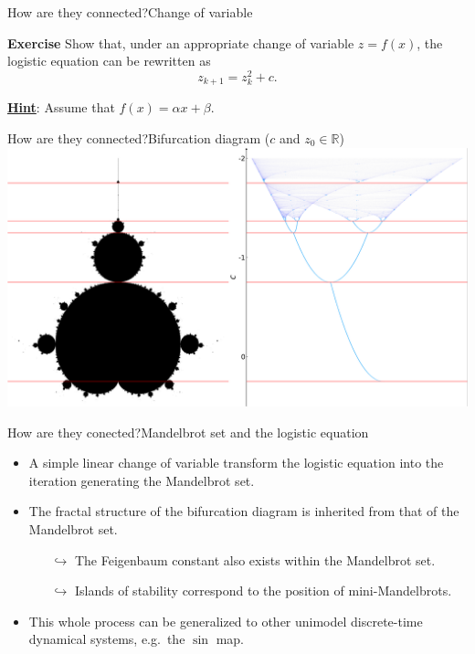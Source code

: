 \documentclass[usenames,dvipsnames,svgnames,10pt,aspectratio=169]{beamer}
\begin{document}
\begin{frame}[t, c]{How are they connected?}{Change of variable}
	\centering
	\begin{block}{\centering \textbf{Exercise}}
		Show that, under an appropriate change of variable $z = f(x)$, the logistic equation can be rewritten as
		$$
		z_{k+1} = z_k^2 + c.
		$$
	\end{block}
	\bigskip
	\underline{\textbf{Hint}}: Assume that $f(x) = \alpha x + \beta$.
	\vspace{1cm}
\end{frame}

\begin{frame}[t, c]{How are they connected?}{Bifurcation diagram ($c$ and $z_0 \in \mathbb{R}$)}
	\centering
	\includegraphics[width=.8\textwidth]{mandelbrot_logistic_bifurcation}
	\vspace{1cm}
\end{frame}

\begin{frame}[t, c]{How are they conected?}{Mandelbrot set and the logistic equation}
	\begin{itemize}
		\item A simple linear change of variable transform the logistic equation into the iteration generating the Mandelbrot set.
		\medskip
		\item The fractal structure of the bifurcation diagram is inherited from that of the Mandelbrot set.
		\begin{itemize}
			\item[$\hookrightarrow$] The Feigenbaum constant also exists within the Mandelbrot set.
			\item[$\hookrightarrow$] Islands of stability correspond to the position of mini-Mandelbrots.
		\end{itemize}
		\medskip
		\item This whole process can be generalized to other unimodel discrete-time dynamical systems, e.g.\ the $\sin$ map.
	\end{itemize}

	\vspace{1cm}
\end{frame}
\end{document}
